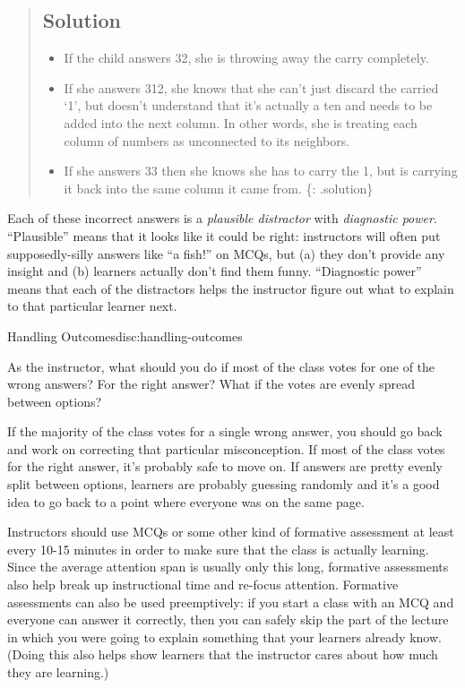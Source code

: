 \begin{quote}
\subsection{Solution}\label{solution}

\begin{itemize}
\item
  If the child answers 32, she is throwing away the carry completely.
\item
  If she answers 312, she knows that she can't just discard the carried
  `1', but doesn't understand that it's actually a ten and needs to be
  added into the next column. In other words, she is treating each
  column of numbers as unconnected to its neighbors.
\item
  If she answers 33 then she knows she has to carry the 1, but is
  carrying it back into the same column it came from. \{: .solution\}
\end{itemize}
\end{quote}

Each of these incorrect answers is a \emph{plausible distractor} with
\emph{diagnostic power}. ``Plausible'' means that it looks like it could
be right: instructors will often put supposedly-silly answers like ``a
fish!'' on MCQs, but (a) they don't provide any insight and (b) learners
actually don't find them funny. ``Diagnostic power'' means that each of
the distractors helps the instructor figure out what to explain to that
particular learner next.

\begin{discussion}{Handling Outcomes}{disc:handling-outcomes}

As the instructor, what should you do if most of the class votes for one
of the wrong answers? For the right answer? What if the votes are evenly
spread between options?
\end{discussion}

If the majority of the class votes for a single wrong answer, you should
go back and work on correcting that particular misconception. If most of
the class votes for the right answer, it's probably safe to move on. If
answers are pretty evenly split between options, learners are probably
guessing randomly and it's a good idea to go back to a point where
everyone was on the same page.

Instructors should use MCQs or some other kind of formative assessment
at least every 10-15 minutes in order to make sure that the class is
actually learning. Since the average attention span is usually only this
long, formative assessments also help break up instructional time and
re-focus attention. Formative assessments can also be used preemptively:
if you start a class with an MCQ and everyone can answer it correctly,
then you can safely skip the part of the lecture in which you were going
to explain something that your learners already know. (Doing this also
helps show learners that the instructor cares about how much they are
learning.)

